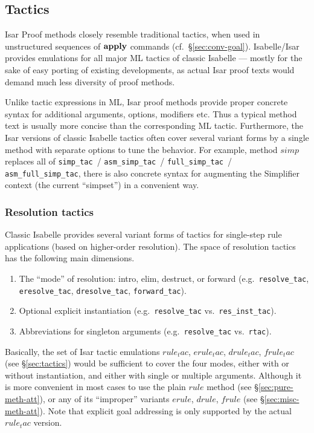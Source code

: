 \subsection{Tactics}\label{sec:conv-tac}

Isar Proof methods closely resemble traditional tactics, when used in
unstructured sequences of ${\mathord{\mathbf{apply}}}$ commands (cf.\ \S\ref{sec:conv-goal}).
Isabelle/Isar provides emulations for all major ML tactics of classic Isabelle
--- mostly for the sake of easy porting of existing developments, as actual
Isar proof texts would demand much less diversity of proof methods.

Unlike tactic expressions in ML, Isar proof methods provide proper concrete
syntax for additional arguments, options, modifiers etc.  Thus a typical
method text is usually more concise than the corresponding ML tactic.
Furthermore, the Isar versions of classic Isabelle tactics often cover several
variant forms by a single method with separate options to tune the behavior.
For example, method $simp$ replaces all of \texttt{simp_tac}~/
\texttt{asm_simp_tac}~/ \texttt{full_simp_tac}~/ \texttt{asm_full_simp_tac},
there is also concrete syntax for augmenting the Simplifier context (the
current ``simpset'') in a convenient way.


\subsubsection{Resolution tactics}

Classic Isabelle provides several variant forms of tactics for single-step
rule applications (based on higher-order resolution).  The space of resolution
tactics has the following main dimensions.
\begin{enumerate}
\item The ``mode'' of resolution: intro, elim, destruct, or forward (e.g.\
  \texttt{resolve_tac}, \texttt{eresolve_tac}, \texttt{dresolve_tac},
  \texttt{forward_tac}).
\item Optional explicit instantiation (e.g.\ \texttt{resolve_tac} vs.\
  \texttt{res_inst_tac}).
\item Abbreviations for singleton arguments (e.g.\ \texttt{resolve_tac} vs.\
  \texttt{rtac}).
\end{enumerate}

Basically, the set of Isar tactic emulations $rule_tac$, $erule_tac$,
$drule_tac$, $frule_tac$ (see \S\ref{sec:tactics}) would be sufficient to
cover the four modes, either with or without instantiation, and either with
single or multiple arguments.  Although it is more convenient in most cases to
use the plain $rule$ method (see \S\ref{sec:pure-meth-att}), or any of its
``improper'' variants $erule$, $drule$, $frule$ (see
\S\ref{sec:misc-meth-att}).  Note that explicit goal addressing is only
supported by the actual $rule_tac$ version.

